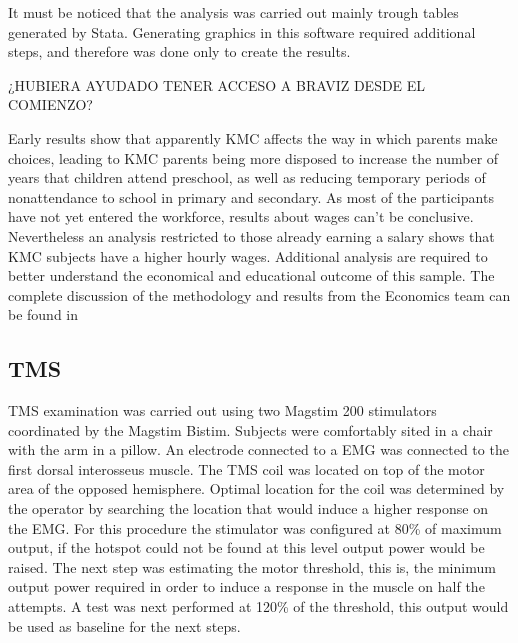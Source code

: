 It must be noticed that the analysis was carried out mainly trough tables generated by Stata. Generating graphics in this software required additional steps, and therefore was done only to create the results.

¿HUBIERA AYUDADO TENER ACCESO A BRAVIZ DESDE EL COMIENZO?

Early results show that apparently KMC affects the way in which parents make choices, leading to KMC parents being more disposed to increase the number of years that children attend preschool, as well as reducing temporary periods of nonattendance to school in primary and secondary. As most of the participants have not yet entered the workforce, results about wages can't be conclusive. Nevertheless an analysis restricted to those already earning a salary shows that KMC subjects have a higher hourly wages. Additional analysis are required to better understand the economical and educational outcome of this sample.  The complete discussion of the methodology and results from the Economics team can be found in \autocite{?}
\subsection{TMS}

TMS examination was carried out using two Magstim 200 stimulators coordinated by the Magstim Bistim. Subjects were comfortably sited in a chair with the arm in a pillow. An electrode connected to a EMG was connected to the first dorsal interosseus muscle. The TMS coil was located on top of the motor area of the opposed hemisphere. Optimal location for the coil was determined by the operator by searching the location that would induce a higher response on the EMG. For this procedure the stimulator was configured at 80\% of maximum output, if the hotspot could not be found at this level output power would be raised. The next step was estimating the motor threshold, this is, the minimum output power required in order to induce a response in the muscle on half the attempts. A test was next performed at 120\% of the threshold, this output would be used as baseline for the next steps.


